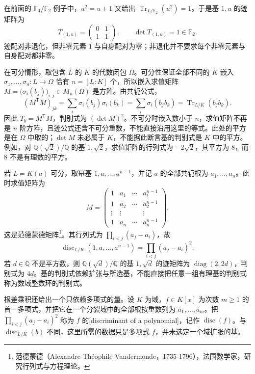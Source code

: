 \ProseParagraphBreak
在前面的 \(\mathbb F_4/\mathbb F_2\) 例子中，\(u^2=u+1\) 又给出 \(\operatorname{Tr}_{L/\mathbb F_2}(u^2)=1\)。于是基 \(1,u\) 的迹矩阵为
\[
	T_{(1,u)}=\begin{pmatrix}0&1\\1&1\end{pmatrix},\qquad \det T_{(1,u)}=1\in\mathbb F_2.
\]
迹配对非退化，但非零元素 \(1\) 与自身配对为零；非退化并不要求每个非零元素与自身配对都非零。

\ProseParagraphBreak
在可分情形，取包含 \(L\) 的 \(K\) 的代数闭包 \(\Omega\)。可分性保证全部不同的 \(K\) 嵌入 \(\sigma_1,\ldots,\sigma_n:L\rightarrow\Omega\) 恰有 \(n=[L:K]\) 个，所以嵌入求值矩阵 \(M=\bigl(\sigma_i(b_j)\bigr)_{i,j}\in M_n(\Omega)\) 是方阵。由共轭公式，
\[
	(M^{\mathsf T}M)_{jk} =\sum_i\sigma_i(b_j)\sigma_i(b_k) =\sum_i\sigma_i(b_jb_k) =\operatorname{Tr}_{L/K}(b_jb_k).
\]
因此 \(T_b=M^{\mathsf T}M\)，判别式为 \((\det M)^2\)。不可分时嵌入数小于 \(n\)，求值矩阵不再是 \(n\) 阶方阵，且迹公式还含不可分重数，不能直接沿用这里的等式。此处的平方是在 \(\Omega\) 中取的；\(\det M\) 未必属于 \(K\)，不能据此断言基的判别式是 \(K\) 中的平方。例如，对 \(\mathbb Q(\sqrt2)/\mathbb Q\) 的基 \(1,\sqrt2\)，求值矩阵的行列式为 \(-2\sqrt2\)，其平方为 \(8\)，而 \(8\) 不是有理数的平方。

\ProseParagraphBreak
若 \(L=K(a)\) 可分，取幂基 \(1,a,\ldots,a^{n-1}\)，并记 \(a\) 的全部共轭根为 \(a_1,\ldots,a_n\)。此时求值矩阵为
\[
	M=\begin{pmatrix}
		1&a_1&\cdots&a_1^{n-1}\\
		1&a_2&\cdots&a_2^{n-1}\\
		\vdots&\vdots&&\vdots\\
		1&a_n&\cdots&a_n^{n-1}
	\end{pmatrix}.
\]
这是范德蒙德矩阵\footnote{范德蒙德（Alexandre-Théophile Vandermonde，1735-1796），法国数学家，研究行列式与方程理论。}。其行列式为 \(\prod_{i<j}(a_j-a_i)\)，故
\begin{equation}\label{b1:eq:power-basis-discriminant}
	\operatorname{disc}_{L/K}(1,a,\ldots,a^{n-1}) =\prod_{i<j}(a_j-a_i)^2.
\end{equation}
若 \(d\in\mathbb Q\) 不是平方数，则 \(\mathbb Q(\sqrt d)/\mathbb Q\) 的基 \(1,\sqrt d\) 的迹矩阵为 \(\operatorname{diag}(2,2d)\)，判别式为 \(4d\)。基的判别式依赖扩张与所选基，不能直接把任意一组有理基的判别式称为数域整数环的判别式。

\ProseParagraphBreak
根差乘积还给出一个只依赖多项式的量。设 \(K\) 为域，\(f\in K[x]\) 为次数 \(m\ge1\) 的首一多项式，并把它在一个分裂域中的全部根按重数列为 \(a_1,\ldots,a_m\)。把 \(\prod_{i<j}(a_j-a_i)^2\) 称为 \(f\) 的[discriminant of a polynomial]，记作 \(\operatorname{disc}(f)\)。与 \(\operatorname{disc}_{L/K}(b)\) 不同，这里所需的数据只是多项式 \(f\)，并未选定一个域扩张的基。


